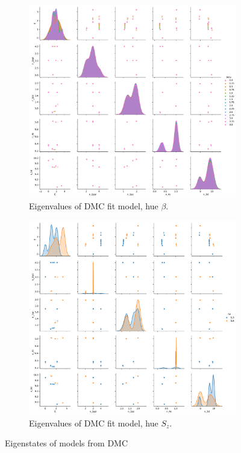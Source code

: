 \documentclass{article}
\begin{document}
\begin{figure}
\centering
\begin{subfigure}{.5\textwidth}
  \centering
  \includegraphics[width=\linewidth]{../qwalk/ub3lyp_s1_/analysis/beta_dmc_eigenvalues.pdf}
  \caption{Eigenvalues of DMC fit model, hue $\beta$.}
  \label{fig:sub1}
\end{subfigure}%
\begin{subfigure}{.5\textwidth}
  \centering
  \includegraphics[width=\linewidth]{../qwalk/ub3lyp_s1_/analysis/beta_dmc_eigenvalues_sz.pdf}
  \caption{Eigenvalues of DMC fit model, hue $S_z$.}
  \label{fig:sub2}
\end{subfigure}
\label{fig:test1}
\caption{Eigenstates of models from DMC}
\end{figure}
\end{document}
